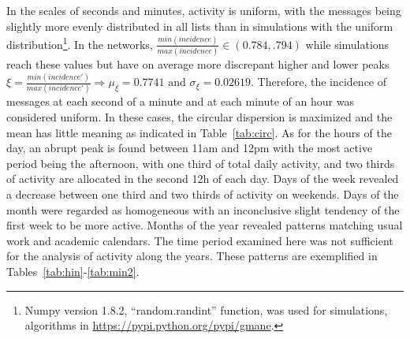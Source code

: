 \documentclass[%
	aip,
	jmp,%
	amsmath,amssymb,
	reprint,%
]{revtex4-1}
\begin{document}
																																																																																In the scales of seconds and minutes, activity is uniform,
																																																																																with the messages being slightly more evenly distributed in all lists than in simulations with the uniform distribution\footnote{Numpy version 1.8.2, ``random.randint'' function, was used for simulations, algorithms in \url{https://pypi.python.org/pypi/gmane}.}.
																																																																																In the networks, $\frac{min(incidence)}{max(incidence)} \in (0.784,.794)$ while simulations reach these values but have on average more discrepant higher and lower peaks $\xi=\frac{min(incidence')}{max(incidence')} \Rightarrow \mu_\xi=0.7741 \text{ and } \sigma_\xi=0.02619$.
																																																																																Therefore, the incidence of messages at each second of a minute and at each minute of an hour was considered uniform.
																																																																																In these cases, the circular dispersion is maximized and the mean has little meaning as indicated in Table~\ref{tab:circ}.
																																																																																As for the hours of the day, an abrupt peak is found between 11am and 12pm with the most active period being the afternoon, with one third of total daily activity, and two thirds of activity are allocated in the second 12h of each day. Days of the week revealed a decrease between one third and two thirds of activity on weekends.
																																																																																Days of the month were regarded as homogeneous with an inconclusive slight tendency of the first week to be more active.
																																																																																Months of the year revealed patterns matching usual work and academic calendars. The time period examined here was not sufficient for the analysis of activity along the years. These patterns are exemplified in Tables~\ref{tab:hin}-\ref{tab:min2}.


																																																																																\FloatBarrier
\end{document}
